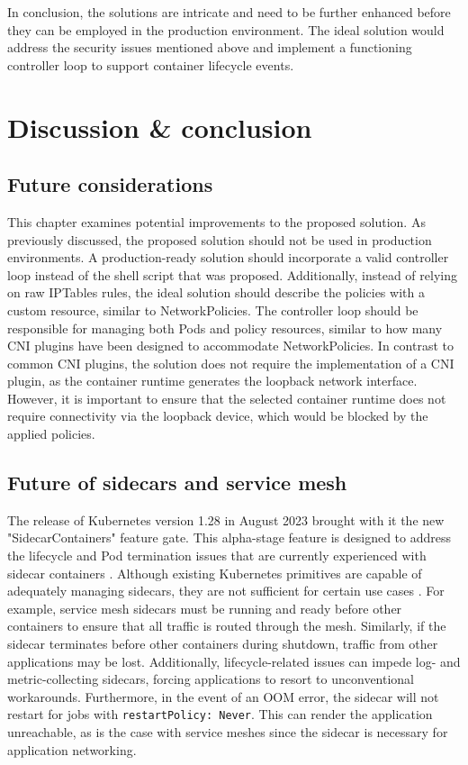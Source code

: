 \documentclass[english, 12pt, a4paper, sci, utf8, a-2b, online]{aaltothesis}
\begin{document}
In conclusion, the solutions are intricate and need to be further enhanced before they can be employed in the production environment.
The ideal solution would address the security issues mentioned above and implement a functioning controller loop to support container lifecycle events.

\clearpage

\section{Discussion \& conclusion} \label{sec:discussion}

\subsection{Future considerations}

This chapter examines potential improvements to the proposed solution.
As previously discussed, the proposed solution should not be used in production environments.
A production-ready solution should incorporate a valid controller loop instead of the shell script that was proposed.
Additionally, instead of relying on raw IPTables rules, the ideal solution should describe the policies with a custom resource, similar to NetworkPolicies.
The controller loop should be responsible for managing both Pods and policy resources, similar to how many CNI plugins have been designed to accommodate NetworkPolicies.
In contrast to common CNI plugins, the solution does not require the implementation of a CNI plugin, as the container runtime generates the loopback network interface.
However, it is important to ensure that the selected container runtime does not require connectivity via the loopback device, which would be blocked by the applied policies.

\subsection{Future of sidecars and service mesh}

The release of Kubernetes version 1.28 in August 2023 brought with it the new "SidecarContainers" feature gate.
This alpha-stage feature is designed to address the lifecycle and Pod termination issues that are currently experienced with sidecar containers \cite{k8s-v1-28-changelog}.
Although existing Kubernetes primitives are capable of adequately managing sidecars, they are not sufficient for certain use cases \cite{k8s-sidecar-kep}.
For example, service mesh sidecars must be running and ready before other containers to ensure that all traffic is routed through the mesh.
Similarly, if the sidecar terminates before other containers during shutdown, traffic from other applications may be lost.
Additionally, lifecycle-related issues can impede log- and metric-collecting sidecars, forcing applications to resort to unconventional workarounds.
Furthermore, in the event of an OOM error, the sidecar will not restart for jobs with \lstinline{restartPolicy: Never}.
This can render the application unreachable, as is the case with service meshes since the sidecar is necessary for application networking.
\end{document}

